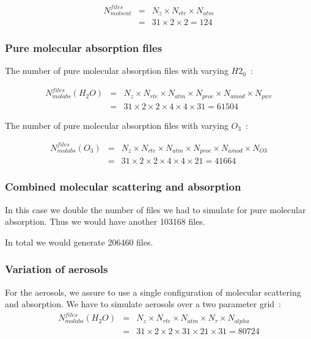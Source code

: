 \documentclass[a4paper]{article}
\begin{document}
\begin{eqnarray}
N^{files}_{molscat} & = & N_z \times N_{rte} \times N_{atm} \\ \nonumber
                               & = & 31 \times 2 \times 2  = 124
\end{eqnarray}

\subsubsection{Pure molecular absorption files}

The number of pure molecular absorption files with varying $H2_0$~:

\begin{eqnarray}
N^{files}_{molabs}(H_2O) & = & N_z \times N_{rte} \times N_{atm} \times N_{proc} \times N_{amod} \times N_{pwv} \\ \nonumber
                                          & =  & 31   \times   2        \times    2         \times     4        \times     4            \times 31 = 61504
\end{eqnarray}

The number of pure molecular absorption files with varying $O_3$~:

\begin{eqnarray}
N^{files}_{molabs}(O_3) & = & N_z \times N_{rte} \times N_{atm} \times N_{proc} \times N_{amod} \times N_{O3} \\ \nonumber
                                          & =  & 31   \times   2        \times    2         \times     4        \times     4            \times 21 = 41664
\end{eqnarray}



\subsubsection{Combined molecular scattering and absorption}

In this case we double the number of files we had to simulate for pure molecular absorption.
Thus we would have another 103168 files.

In total we would generate 206460 files.


\subsubsection{Variation of aerosols}
For the aerosols, we assure to use a single configuration of molecular scattering and absorption.
We have to simulate aerosols over a two parameter grid~:
\begin{eqnarray}
N^{files}_{molabs}(H_2O) & = & N_z \times N_{rte} \times N_{atm} \times N_{\tau} \times N_{alpha}  \\ \nonumber
                                          & =  & 31   \times   2        \times    2         \times     31        \times     21            \times 31 = 80724
\end{eqnarray}
\end{document}
